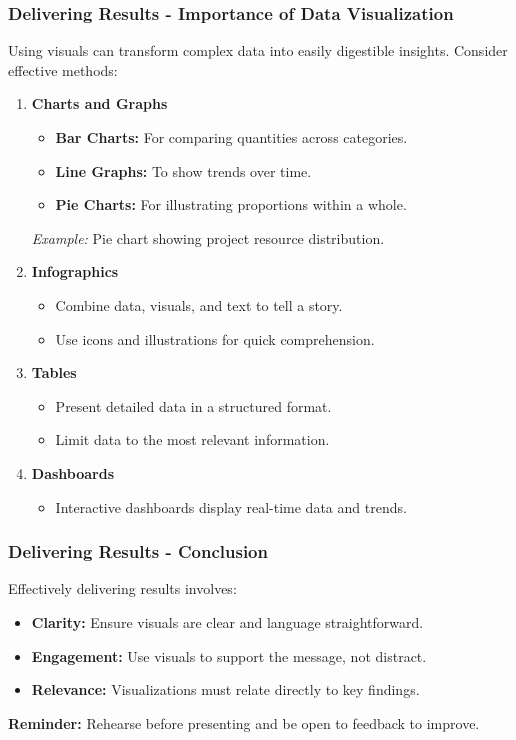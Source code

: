 \documentclass[aspectratio=169]{beamer}
\begin{document}
\begin{frame}[fragile]
    \frametitle{Delivering Results - Importance of Data Visualization}
    Using visuals can transform complex data into easily digestible insights. Consider effective methods:
    \begin{enumerate}
        \item \textbf{Charts and Graphs}
            \begin{itemize}
                \item \textbf{Bar Charts:} For comparing quantities across categories.
                \item \textbf{Line Graphs:} To show trends over time.
                \item \textbf{Pie Charts:} For illustrating proportions within a whole.
            \end{itemize}
            \textit{Example:} Pie chart showing project resource distribution.
        \item \textbf{Infographics}
            \begin{itemize}
                \item Combine data, visuals, and text to tell a story.
                \item Use icons and illustrations for quick comprehension.
            \end{itemize}
        \item \textbf{Tables}
            \begin{itemize}
                \item Present detailed data in a structured format.
                \item Limit data to the most relevant information.
            \end{itemize}
        \item \textbf{Dashboards}
            \begin{itemize}
                \item Interactive dashboards display real-time data and trends.
            \end{itemize}
    \end{enumerate}
\end{frame}

\begin{frame}[fragile]
    \frametitle{Delivering Results - Conclusion}
    Effectively delivering results involves:
    \begin{itemize}
        \item \textbf{Clarity:} Ensure visuals are clear and language straightforward.
        \item \textbf{Engagement:} Use visuals to support the message, not distract.
        \item \textbf{Relevance:} Visualizations must relate directly to key findings.
    \end{itemize}
    \textbf{Reminder:} Rehearse before presenting and be open to feedback to improve.
\end{frame}
\end{document}
